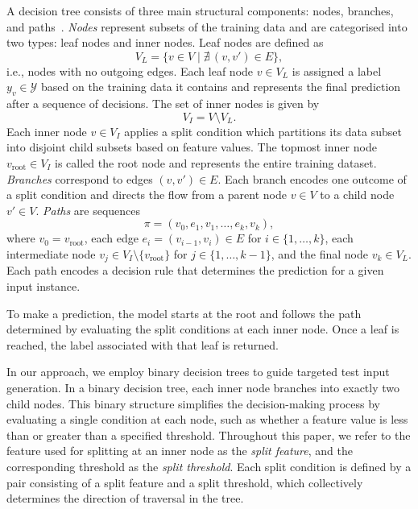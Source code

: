 \documentclass[
]{ceurart}
\theoremstyle{definition}
\begin{document}
A decision tree consists of three main structural components: nodes, branches, and paths~\cite{components}. \textit{Nodes} represent subsets of the training data and are categorised into two types: leaf nodes and inner nodes. Leaf nodes are defined as
\begin{equation}
V_L = \{ v \in V \mid \nexists\, (v, v') \in E \}, 
\end{equation}
i.e., nodes with no outgoing edges. Each leaf node $v \in V_L$ is assigned a label $y_v \in \mathcal{Y}$ based on the training data it contains and represents the final prediction after a sequence of decisions. The set of inner nodes is given by
\begin{equation}
V_I = V \setminus V_L.
\end{equation}
Each inner node $v \in V_I$ applies a split condition which partitions its data subset into disjoint child subsets based on feature values. The topmost inner node $v_{\text{root}} \in V_I$ is called the root node and represents the entire training dataset. \textit{Branches} correspond to edges $(v, v') \in E$. Each branch encodes one outcome of a split condition and directs the flow from a parent node $v \in V$ to a child node $v' \in V$. \textit{Paths} are sequences 
\begin{equation}
\pi = (v_0, e_1, v_1, \ldots, e_k, v_k),
\end{equation}
where ${v_0 = v_{\text{root}}}$, each edge ${e_i = (v_{i-1}, v_i) \in E}$ for ${i \in \{ 1, \dots, k \}}$, each intermediate node ${v_j \in V_I \setminus \{v_{\text{root}}\}}$ for $j \in \{ 1, \dots, k-1 \}$, and the final node $v_k \in V_L$. Each path encodes a decision rule that determines the prediction for a given input instance.

To make a prediction, the model starts at the root and follows the path determined by evaluating the split conditions at each inner node. Once a leaf is reached, the label associated with that leaf is returned.

In our approach, we employ binary decision trees to guide targeted test input generation. In a binary decision tree, each inner node branches into exactly two child nodes. This binary structure simplifies the decision-making process by evaluating a single condition at each node, such as whether a feature value is less than or greater than a specified threshold. Throughout this paper, we refer to the feature used for splitting at an inner node as the \textit{split feature}, and the corresponding threshold as the \textit{split threshold}. Each split condition is defined by a pair consisting of a split feature and a split threshold, which collectively determines the direction of traversal in the tree.
\end{document}
